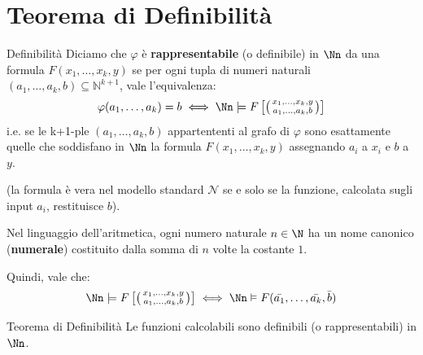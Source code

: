 \documentclass[a4paper,11pt]{report}
\newcommand{\ass}[2]{%
    \left( \begin{smallmatrix} #1 \\ #2 \end{smallmatrix} \right)
}
\begin{document}
\section{Teorema di Definibilità}
\begin{defframe}{Definibilità}{}
    Diciamo che \( \varphi \) è \textbf{rappresentabile} (o definibile) in \( \Nn \) da una formula \( F(x_1, \dots, x_k, y) \) se per ogni tupla di numeri naturali \((a_1, \dots, a_k, b) \subseteq \mathbb{N}^{k+1}\), vale l'equivalenza:
    \[
        \varphi(a_1, \dots, a_k) = b \iff \Nn \models F \left[\ass{x_1, \dots, x_k, y}{a_1, \dots, a_k, b}\right]
    \]
i.e. se le k+1-ple \( (a_1, \dots, a_k, b) \) appartententi al grafo di \( \varphi \) sono esattamente quelle che soddisfano in \( \Nn \) la formula \( F(x_1, \dots, x_k, y) \) assegnando \( a_i \) a \( x_i \) e \( b \) a \( y \).

{\color{Gray}\small(la formula è vera nel modello standard \(\mathcal{N}\) se e solo se la funzione, calcolata sugli input \(a_i\), restituisce \(b\)).}

Nel linguaggio dell'aritmetica, ogni numero naturale \( n\in \N \) ha un nome canonico (\textbf{numerale}) costituito dalla somma di \( n \) volte la costante \( 1 \).

Quindi, vale che:
\[  \Nn \models F \left[\ass{x_1, \dots, x_k, y}{a_1, \dots, a_k, b}\right] \iff \Nn \vDash F(\bar{a_1}, \dots, \bar{a_k}, \bar{b})\]
\end{defframe}

\begin{thmframe}{Teorema di Definibilità}{}
    Le funzioni calcolabili sono definibili (o rappresentabili) in \( \Nn \).
\end{thmframe}
\end{document}
